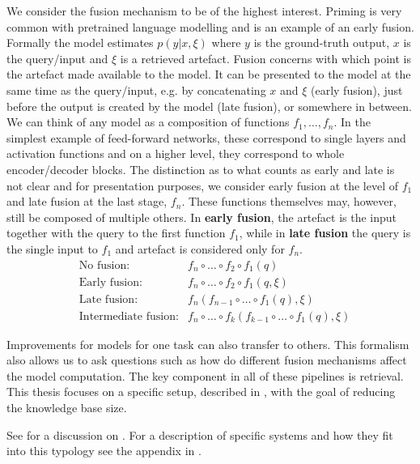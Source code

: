 We consider the fusion mechanism to be of the highest interest.
Priming is very common with pretrained language modelling and is an example of an early fusion.
Formally the model estimates $p(y|x,\xi)$ where $y$ is the ground-truth output, $x$ is the query/input and $\xi$ is a retrieved artefact. Fusion \citet{sun2018open} concerns with which point is the artefact made available to the model. It can be presented to the model at the same time as the query/input, e.g. by concatenating $x$ and $\xi$ (early fusion), just before the output is created by the model (late fusion), or somewhere in between.
We can think of any model as a composition of functions $f_1, \ldots, f_n$.
In the simplest example of feed-forward networks, these correspond to single layers and activation functions and on a higher level, they correspond to whole encoder/decoder blocks. The distinction as to what counts as early and late is not clear and for presentation purposes, we consider early fusion at the level of $f_1$ and late fusion at the last stage, $f_n$. These functions themselves may, however, still be composed of multiple others. In \textbf{early fusion}, the artefact is the input together with the query to the first function $f_1$, while in \textbf{late fusion} the query is the single input to $f_1$ and artefact is considered only for $f_n$.
\begin{align*}
     & \text{No fusion:}           & f_n \circ \ldots \circ f_2 \circ f_1 (q)                              \\
     & \text{Early fusion:}        & f_n \circ \ldots \circ f_2 \circ f_1 (q, \xi)                         \\
     & \text{Late fusion:}         & f_n ( f_{n-1} \circ \ldots \circ f_1 (q), \xi)                        \\
     & \text{Intermediate fusion:} & f_n \circ \ldots \circ f_k ( f_{k-1} \circ \ldots \circ f_1 (q), \xi)
\end{align*}

Improvements for models for one task can also transfer to others.
This formalism also allows us to ask questions such as how do different fusion mechanisms affect the model computation.
The key component in all of these pipelines is retrieval.
This thesis focuses on a specific setup, described in , with the goal of reducing the knowledge base size.

See  for a discussion on .
For a description of specific systems and how they fit into this typology see the appendix in \citet{zouhar2021artefact}.


